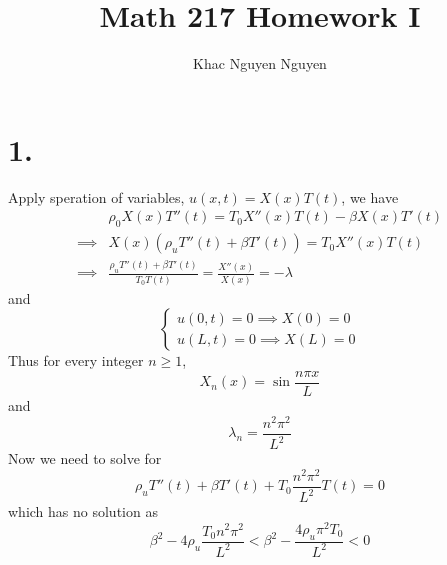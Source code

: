 \documentclass[11pt]{article}
\title{\textbf{Math 217 Homework I}}
\author{Khac Nguyen Nguyen}
\date{}
\theoremstyle{mystyle}
\theoremstyle{definition}
\begin{document}
\section*{1.}
Apply speration of variables, $u(x,t) = X(x) T(t)$, we have 
\begin{align*}
  &\rho_0 X(x) T''(t) = T_0 X''(x)T(t) - \beta X(x)T'(t) \\ 
  \implies & X(x) (\rho_u T''(t) + \beta T'(t)) = T_0 X''(x)T(t) \\
  \implies & \displaystyle\frac{\rho_u T''(t) + \beta T'(t)}{T_0 T(t)} = \displaystyle\frac{X''(x)}{X(x)} = - \lambda
\end{align*}
and 
\[
  \begin{cases}
    u(0,t) = 0 \implies X(0) = 0 \\
    u(L,t) = 0 \implies X(L) = 0
  \end{cases}
\]
Thus for every integer $n\ge 1$,  
\[
  X_n(x) = \sin \displaystyle\frac{n\pi x}{L}
\]
and 
\[
  \lambda_n = \displaystyle\frac{n^2\pi^2}{L^2}
\]
Now we need to solve for 
\[
  \rho_u T''(t) + \beta T'(t) + T_0 \displaystyle\frac{n^2 \pi^2}{L^2} T(t) = 0
\]
which has no solution as 
\[
 \beta^2 - 4 \rho_u \displaystyle\frac{T_0 n^2 \pi^2}{L^2} < \beta^2 -\displaystyle\frac{4 \rho_u \pi^2 T_0}{L^2} < 0 
\]
\newpage
\end{document}
